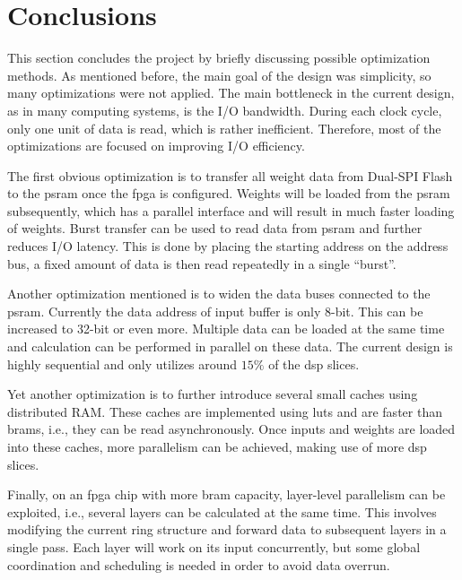 
\chapter{Conclusions}

This section concludes the project by briefly discussing possible optimization methods.
As mentioned before, the main goal of the design was simplicity, so many optimizations were not applied.
The main bottleneck in the current design, as in many computing systems, is the I/O bandwidth. During
each clock cycle, only one unit of data is read, which is rather inefficient. Therefore, most of the
optimizations are focused on improving I/O efficiency.

The first obvious optimization is to transfer all weight data from Dual-SPI Flash to the \gls{psram} once
the \gls{fpga} is configured. Weights will be loaded from the \gls{psram} subsequently, which has a parallel
interface and will result in much faster loading of weights.
Burst transfer can be used to read data from \gls{psram} and further reduces I/O latency. This is done by
placing the starting address on the address bus, a fixed amount of data is then read repeatedly in a single
``burst''.

Another optimization mentioned is to widen the data buses connected to the \gls{psram}. Currently the
data address of input buffer is only 8-bit. This can be increased to 32-bit or even more. Multiple data
can be loaded at the same time and calculation can be performed in parallel on these data. The current
design is highly sequential and only utilizes around $15\%$ of the \gls{dsp} slices.

Yet another optimization is to further introduce several small caches using distributed RAM. These caches
are implemented using \glspl{lut} and are faster than \glspl{bram}, i.e., they can be read asynchronously.
Once inputs and weights are loaded into these caches, more parallelism can be achieved,
making use of more \gls{dsp} slices.

Finally, on an \gls{fpga} chip with more \gls{bram} capacity, layer-level parallelism can be exploited, i.e.,
several layers can be calculated at the same time. This involves modifying the current ring structure and
forward data to subsequent layers in a single pass. Each layer will work on its input concurrently, but
some global coordination and scheduling is needed in order to avoid data overrun.

\clearpage %
